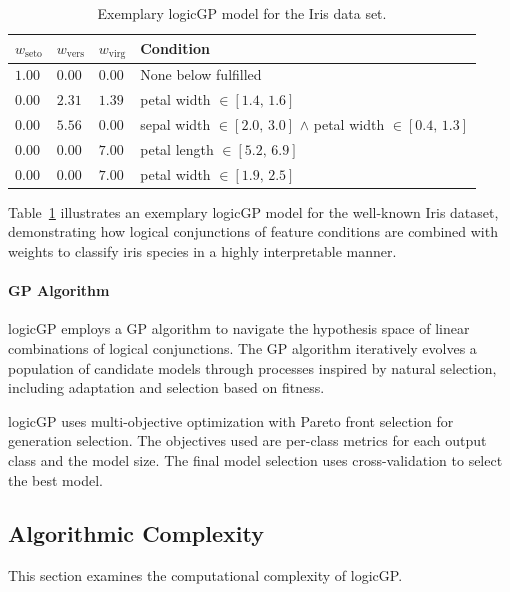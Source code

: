 \documentclass[a4paper,twoside]{article}
\begin{document}
\begin{table}
   \centering
   \caption{Exemplary logicGP model for the Iris data set.}
   \label{tab:iris_example}
   \begin{tabular}{p{0.4cm} p{0.4cm} p{0.4cm} p{4.2cm}}
      \toprule
      $w_{\text{seto}}$ & $w_{\text{vers}}$ & $w_{\text{virg}}$ & Condition \\
      \midrule
      $1.00$ & $0.00$ & $0.00$ & None below fulfilled \\
      $0.00$ & $2.31$ & $1.39$ & petal width $\in [1.4,\,1.6]$ \\
      $0.00$ & $5.56$ & $0.00$ & sepal width $\in [2.0,\,3.0]$ $\wedge$ petal width $\in [0.4,\,1.3]$ \\
      $0.00$ & $0.00$ & $7.00$ & petal length $\in [5.2,\,6.9]$ \\
      $0.00$ & $0.00$ & $7.00$ & petal width $\in [1.9,\,2.5]$ \\
      \bottomrule
   \end{tabular}
\end{table}

Table~\ref{tab:iris_example} illustrates an exemplary logicGP model for the well-known Iris dataset, demonstrating how logical conjunctions of feature conditions are combined with weights to classify iris species in a highly interpretable manner.


\paragraph{GP Algorithm}

logicGP employs a GP algorithm \citep{Koza1992} to navigate the hypothesis space of linear combinations of logical conjunctions. The GP algorithm iteratively evolves a population of candidate models through processes inspired by natural selection, including adaptation and selection based on fitness.

logicGP uses multi-objective optimization with Pareto front selection for generation selection. The objectives used are per-class metrics for each output class and the model size. The final model selection uses cross-validation to select the best model.

\subsection{Algorithmic Complexity}\label{sec:complexity}

This section examines the computational complexity of logicGP.
\end{document}

